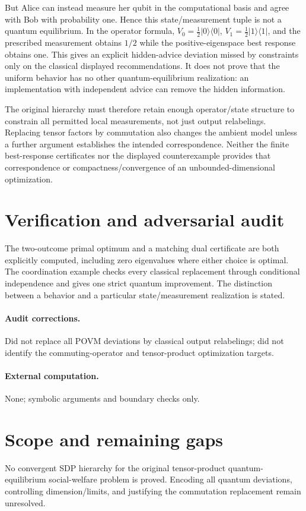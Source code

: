\documentclass[11pt]{article}
\begin{document}
But Alice can instead measure her qubit in the computational basis and agree with Bob with probability one. Hence this state/measurement tuple is not a quantum equilibrium. In the operator formula, $V_0=\tfrac12|0\rangle\langle0|$, $V_1=\tfrac12|1\rangle\langle1|$, and the prescribed measurement obtains $1/2$ while the positive-eigenspace best response obtains one. This gives an explicit hidden-advice deviation missed by constraints only on the classical displayed recommendations. It does not prove that the uniform behavior has no other quantum-equilibrium realization: an implementation with independent advice can remove the hidden information.

The original hierarchy must therefore retain enough operator/state structure to constrain all permitted local measurements, not just output relabelings. Replacing tensor factors by commutation also changes the ambient model unless a further argument establishes the intended correspondence. Neither the finite best-response certificates nor the displayed counterexample provides that correspondence or compactness/convergence of an unbounded-dimensional optimization.
\section{Verification and adversarial audit}
The two-outcome primal optimum and a matching dual certificate are both explicitly computed, including zero eigenvalues where either choice is optimal. The coordination example checks every classical replacement through conditional independence and gives one strict quantum improvement. The distinction between a behavior and a particular state/measurement realization is stated.
\paragraph{Audit corrections.} Did not replace all POVM deviations by classical output relabelings; did not identify the commuting-operator and tensor-product optimization targets.
\paragraph{External computation.} None; symbolic arguments and boundary checks only.
\section{Scope and remaining gaps}
No convergent SDP hierarchy for the original tensor-product quantum-equilibrium social-welfare problem is proved. Encoding all quantum deviations, controlling dimension/limits, and justifying the commutation replacement remain unresolved.
\end{document}
